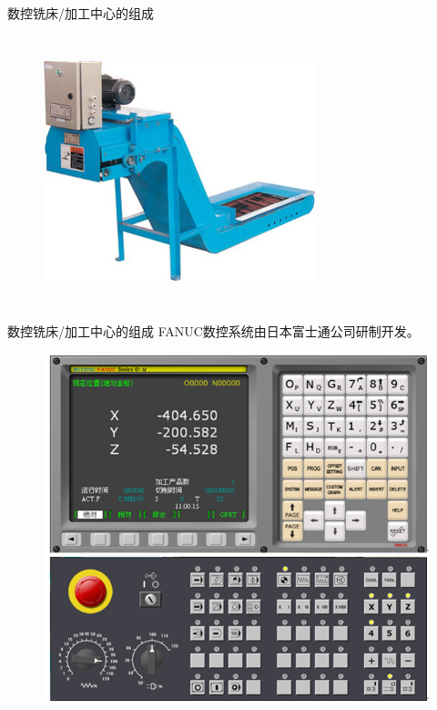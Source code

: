 \documentclass[UTF8,zihao=-4]{ctexbeamer}
\begin{document}
\begin{frame}{数控铣床/加工中心的组成}
\begin{columns}
\begin{figure}
	\includegraphics[width= \linewidth]{image/1-17}
	\label{fig:1-17}
\end{figure}	
\end{columns}
\end{frame}


\begin{frame}{数控铣床/加工中心的组成}
\centering FANUC数控系统由日本富士通公司研制开发。

	\begin{figure}
		\centering
		\includegraphics[width= 0.5\linewidth]{image/1-18}
		\label{fig:1-18}
	\end{figure}
	
\end{frame}
\end{document}
